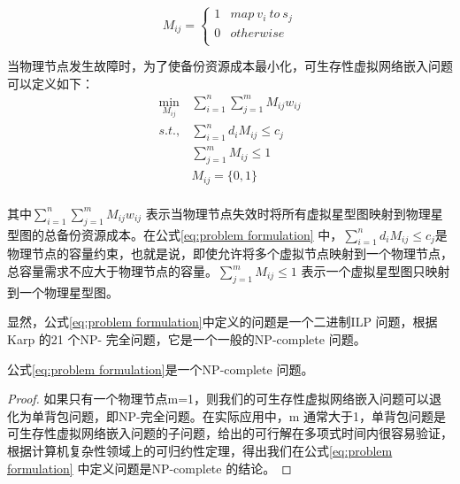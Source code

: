 \begin{equation}
{M_{ij}} = \left\{ {\begin{array}{*{20}{c}}
   1 & {map \ v_i \  to  \ s_j}  \\
   0 & {otherwise}  \\
\end{array}} \right.
\label{eq:indication}
\end{equation}

当物理节点发生故障时，为了使备份资源成本最小化，可生存性虚拟网络嵌入问题可以定义如下：
\begin{equation}
\begin{array}{*{20}{c}}
   {\mathop {\min }\limits_{{M_{ij}}} } & {\sum\limits_{i = 1}^n {\sum\limits_{j = 1}^m {{M_{ij}}{w_{ij}}} } }  \\
   {s.t.,} & {\sum\limits_{i = 1}^n {{d_i}{M_{ij}}}  \le {c_j}}  \\
   {} & {\sum\limits_{j = 1}^m {{M_{ij}}}  \le 1}  \\
   {} & {{M_{ij}} = \{ 0,1\} }  \\
\end{array}
\label{eq:problem formulation}
\end{equation}

其中${\sum\limits_{i = 1}^n {\sum\limits_{j = 1}^m {{M_{ij}}{w_{ij}}} } }$ 表示当物理节点失效时将所有虚拟星型图映射到物理星型图的总备份资源成本。在公式\ref{eq:problem formulation} 中，${\sum\limits_{i = 1}^n {{d_i}{M_{ij}}}  \le {c_j}}$是物理节点的容量约束，也就是说，即使允许将多个虚拟节点映射到一个物理节点，总容量需求不应大于物理节点的容量。${\sum\limits_{j = 1}^m {{M_{ij}}}  \le 1}$ 表示一个虚拟星型图只映射到一个物理星型图。

显然，公式\ref{eq:problem formulation}中定义的问题是一个二进制ILP 问题，根据Karp 的21 个NP- 完全问题\cite{karp1975computational}，它是一个一般的NP-complete 问题。

\begin{theorem}
公式\ref{eq:problem formulation}是一个NP-complete 问题。
\end{theorem}
\begin{proof}
如果只有一个物理节点m=1，则我们的可生存性虚拟网络嵌入问题可以退化为单背包问题，即NP-完全问题。在实际应用中，m 通常大于1，单背包问题是可生存性虚拟网络嵌入问题的子问题，给出的可行解在多项式时间内很容易验证，根据计算机复杂性领域上的可归约性定理\cite{wood1987theory}，得出我们在公式\ref{eq:problem formulation} 中定义问题是NP-complete 的结论。
\end{proof}

